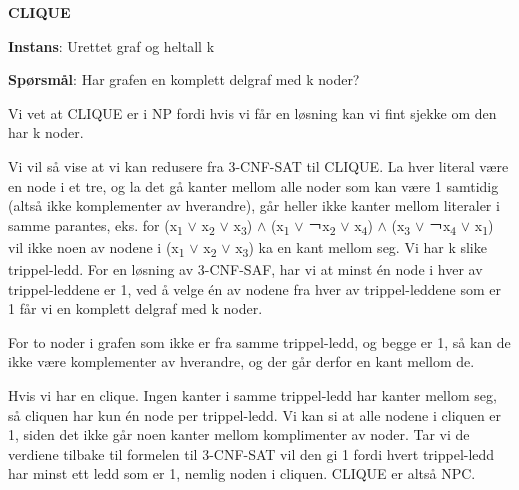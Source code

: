\documentclass[12pt]{report}
\begin{document}
\vspace{\baselineskip}
\textbf{CLIQUE}\par

\textbf{Instans}: Urettet graf og heltall k\par

\textbf{Spørsmål}: Har grafen en komplett delgraf med k noder?\par


\vspace{\baselineskip}
Vi vet at CLIQUE er i NP fordi hvis vi får en løsning kan vi fint sjekke om den har k noder.\par

Vi vil så vise at vi kan redusere fra 3-CNF-SAT til CLIQUE. La hver literal være en node i et tre, og la det gå kanter mellom alle noder som kan være 1 samtidig (altså ikke komplementer av hverandre), går heller ikke kanter mellom literaler i samme parantes, eks. for (x\textsubscript{1} $ \vee $  x\textsubscript{2} $ \vee $  x\textsubscript{3}) $\wedge$  (x\textsubscript{1} $ \vee $  ￢x\textsubscript{2} $ \vee $  x\textsubscript{4}) $\wedge$  (x\textsubscript{3} $ \vee $  ￢x\textsubscript{4} $ \vee $  x\textsubscript{1}) vil ikke noen av nodene i (x\textsubscript{1} $ \vee $  x\textsubscript{2} $ \vee $  x\textsubscript{3}) ka en kant mellom seg. Vi har k slike trippel-ledd. For en løsning av 3-CNF-SAF, har vi at minst én node i hver av trippel-leddene er 1, ved å velge én av nodene fra hver av trippel-leddene som er 1 får vi en komplett delgraf med k noder. \par

For to noder i grafen som ikke er fra samme trippel-ledd, og begge er 1, så kan de ikke være komplementer av hverandre, og der går derfor en kant mellom de. \par

Hvis vi har en clique. Ingen kanter i samme trippel-ledd har kanter mellom seg, så cliquen har kun én node per trippel-ledd. Vi kan si at alle nodene i cliquen er 1, siden det ikke går noen kanter mellom komplimenter av noder. Tar vi de verdiene tilbake til formelen til 3-CNF-SAT vil den gi 1 fordi hvert trippel-ledd har minst ett ledd som er 1, nemlig noden i cliquen. CLIQUE er altså NPC. \par



\end{document}
